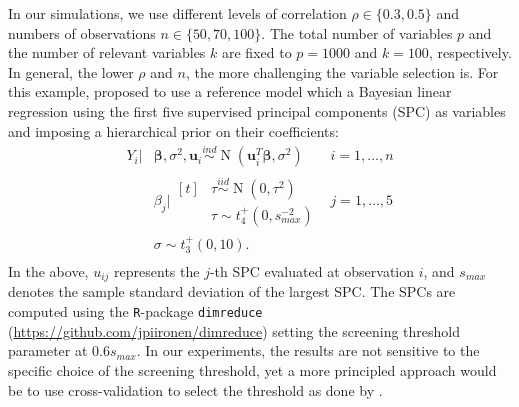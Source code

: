 \documentclass[a4]{article}
\theoremstyle{definition}
\DeclareMathOperator{\N}{N}
\begin{document}
In our simulations, we use different levels of correlation 
$\rho\in\{0.3,0.5\}$ and numbers of
observations $n\in\{50,70,100\}$. The total number of variables $p$
and the number of relevant variables $k$ are fixed to $p = 1000$ and
$k = 100$, respectively. In general, the lower $\rho$ and $n$, the
more challenging the variable selection is. For this example, \citet{paper:projpred} proposed to
use a reference model which a Bayesian linear regression using the first five
supervised principal components (SPC) as variables and imposing a hierarchical prior on
their coefficients:
\begin{equation}
\label{eq:ref_mod}
\begin{aligned}
    Y_{i}|&\boldsymbol{\beta},\sigma^{2},\boldsymbol{u}_{i} \overset{ind}{\sim} \N(\boldsymbol{u}_{i}^{T}\boldsymbol{\beta},\sigma^{2}) \quad &i=1,\ldots,n \\
    &\beta_{j}|\!\begin{aligned}[t] &\tau \overset{iid}{\sim} \N(0,\tau^{2})\\
    &\tau \sim t_{4}^{+}(0,s_{max}^{-2}) 
    \end{aligned} &j=1,\ldots,5 \\ 
    &\sigma \sim t_{3}^{+}(0,10). \\
\end{aligned}
\end{equation}
In the above, $u_{ij}$ represents the $j$-th SPC evaluated at
observation $i$, and $s_{max}$ denotes the sample standard deviation
of the largest SPC.  The SPCs are computed using the
\texttt{R}-package \texttt{dimreduce} (\url{https://github.com/jpiironen/dimreduce}) setting the screening threshold
parameter at $0.6s_{max}$.  In our experiments, the results are not
sensitive to the specific choice of the screening threshold, yet a more
principled approach would be to use cross-validation to select the
threshold as done by \citet{paper:projpred}.
\end{document}
